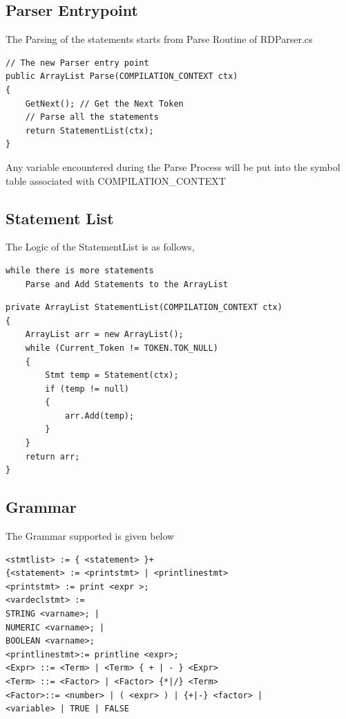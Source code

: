 \subsection{Parser Entrypoint}
The Parsing of the statements starts from Parse Routine of RDParser.cs
\lstset{style=csharp}
\begin{lstlisting}
// The new Parser entry point
public ArrayList Parse(COMPILATION_CONTEXT ctx)
{
	GetNext(); // Get the Next Token
	// Parse all the statements
	return StatementList(ctx);
}
\end{lstlisting}
Any variable encountered during the Parse Process will be put into the symbol table associated with COMPILATION\_CONTEXT
\subsection{Statement List}
The Logic of the StatementList is as follows,
\begin{verbatim}
while there is more statements
	Parse and Add Statements to the ArrayList
\end{verbatim}


\lstset{style=csharp}
\begin{lstlisting}
private ArrayList StatementList(COMPILATION_CONTEXT ctx)
{
	ArrayList arr = new ArrayList();
	while (Current_Token != TOKEN.TOK_NULL)
	{
		Stmt temp = Statement(ctx);
		if (temp != null)
		{
			arr.Add(temp);
		}
	}
	return arr;
}
\end{lstlisting}

\subsection{Grammar}
The Grammar supported is given below
\lstset{style=csharp}
\begin{lstlisting}
<stmtlist> := { <statement> }+
{<statement> := <printstmt> | <printlinestmt>
<printstmt> := print <expr >;
<vardeclstmt> := 
STRING <varname>; |
NUMERIC <varname>; |
BOOLEAN <varname>;
<printlinestmt>:= printline <expr>;
<Expr> ::= <Term> | <Term> { + | - } <Expr>
<Term> ::= <Factor> | <Factor> {*|/} <Term>
<Factor>::= <number> | ( <expr> ) | {+|-} <factor> |
<variable> | TRUE | FALSE
\end{lstlisting}


